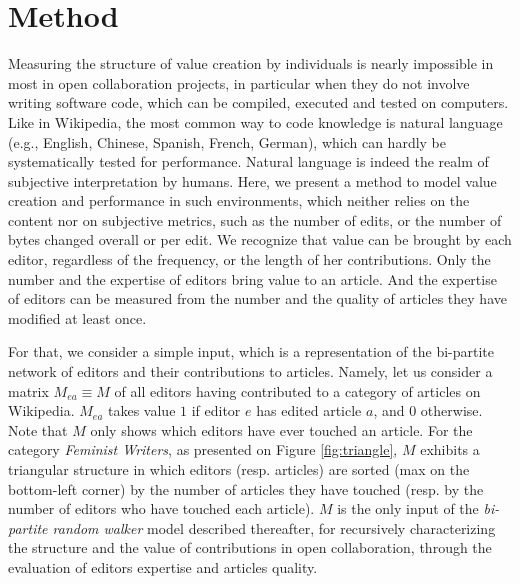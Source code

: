 \section{Method}
\label{method}
Measuring the structure of value creation by individuals is nearly impossible in most in open collaboration projects, in particular when they do not involve writing software code, which can be compiled, executed and tested on computers. Like in Wikipedia, the most common way to code knowledge is natural language (e.g., English, Chinese, Spanish, French, German), which can hardly be systematically tested for performance. Natural language is indeed the realm of subjective interpretation by humans. Here, we present a method to model value creation and performance in such environments, which neither relies on the content nor on subjective metrics, such as the number of edits, or the number of bytes changed overall or per edit. We recognize that value can be brought by each editor, regardless of the frequency, or the length of her contributions. Only the number and the expertise of editors bring value to an article.  And the expertise of editors can be measured from the number and the quality of articles they have modified at least once.

For that, we consider a simple input, which is a representation of the bi-partite network of editors and their contributions to articles.  Namely, let us consider a matrix $M_{ea} \equiv M$ of all editors having contributed to a category of articles on Wikipedia. $M_{ea}$ takes value $1$ if editor $e$ has edited article $a$, and $0$ otherwise. Note that $M$ only shows which editors have ever touched an article. For the category {\it Feminist Writers}, as presented on Figure \ref{fig:triangle}, $M$ exhibits a triangular structure in which editors (resp. articles) are sorted (max on the bottom-left corner) by the number of articles they have touched (resp. by the number of editors who have touched each article). $M$ is the only input of the {\it bi-partite random walker} model described thereafter, for recursively characterizing the structure and the value of contributions in open collaboration, through the evaluation of editors expertise and articles quality.

